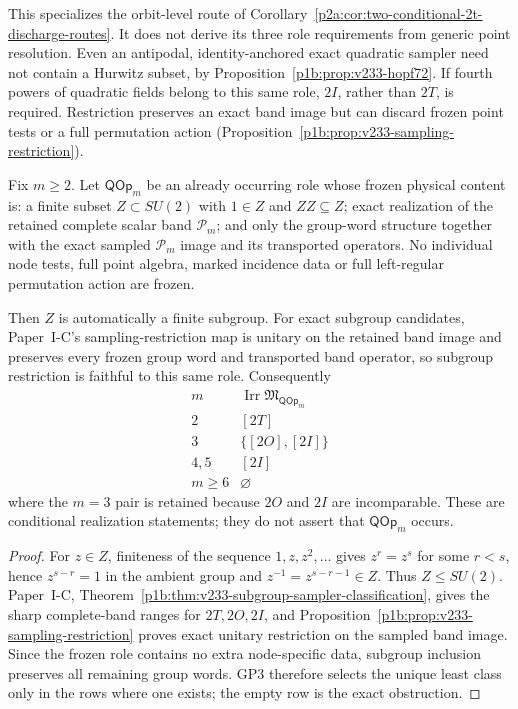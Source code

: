 \documentclass[12pt,a4paper]{article}
\begin{document}
This specializes the orbit-level route of
Corollary~\ref{p2a:cor:two-conditional-2t-discharge-routes}.
It does not derive its three role requirements from generic point
resolution. Even an antipodal, identity-anchored exact quadratic
sampler need not contain a Hurwitz subset, by
Proposition~\ref{p1b:prop:v233-hopf72}. If fourth powers of quadratic
fields belong to this same role, \(2I\), rather than \(2T\), is required.
Restriction preserves an exact band image but can discard frozen point
tests or a full permutation action
(Proposition~\ref{p1b:prop:v233-sampling-restriction}).


\begin{theorem}
\label{p2a:thm:v236-qop-exceptional-frontier}
Fix \(m\ge2\).  Let \(\mathsf{QOp}_m\) be an already occurring role whose
frozen physical content is: a finite subset \(Z\subset SU(2)\) with
\(1\in Z\) and \(ZZ\subseteq Z\); exact realization of the retained complete
scalar band \(\mathcal P_m\); and only the group-word structure together with
the exact sampled \(\mathcal P_m\) image and its transported operators.  No
individual node tests, full point algebra, marked incidence data or full
left-regular permutation action are frozen.

Then \(Z\) is automatically a finite subgroup.  For exact subgroup candidates,
Paper~I-C's sampling-restriction map is unitary on the retained band image and
preserves every frozen group word and transported band operator, so subgroup
restriction is faithful to this same role.  Consequently
\[
 \boxed{
 \begin{array}{c|c}
 m & \operatorname{Irr}\mathfrak M_{\mathsf{QOp}_m}\\ \hline
 2 & [2T]\\
 3 & \{[2O],[2I]\}\\
 4,5 & [2I]\\
 m\ge6 & \varnothing
 \end{array}}
\]
where the \(m=3\) pair is retained because \(2O\) and \(2I\) are
incomparable.  These are conditional realization statements; they do not
assert that \(\mathsf{QOp}_m\) occurs.
\end{theorem}
\begin{proof}
For \(z\in Z\), finiteness of the sequence \(1,z,z^2,\ldots\) gives
\(z^r=z^s\) for some \(r<s\), hence \(z^{s-r}=1\) in the ambient group and
\(z^{-1}=z^{s-r-1}\in Z\).  Thus \(Z\le SU(2)\).  Paper~I-C,
Theorem~\ref{p1b:thm:v233-subgroup-sampler-classification}, gives the sharp
complete-band ranges for \(2T,2O,2I\), and
Proposition~\ref{p1b:prop:v233-sampling-restriction} proves exact unitary
restriction on the sampled band image.  Since the frozen role contains no
extra node-specific data, subgroup inclusion preserves all remaining group
words.  GP3 therefore selects the unique least class only in the rows where
one exists; the empty row is the exact obstruction.
\end{proof}
\end{document}
